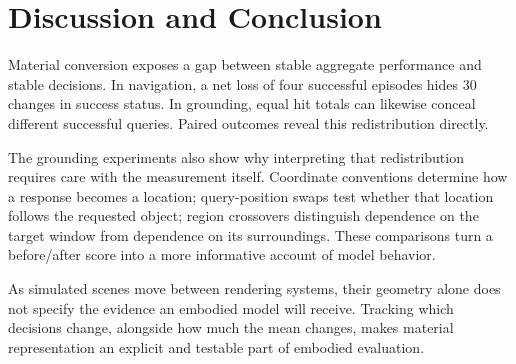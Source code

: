 \section{Discussion and Conclusion}

Material conversion exposes a gap between stable aggregate performance and
stable decisions. In navigation, a net loss of four successful episodes hides
30 changes in success status. In grounding, equal hit totals can likewise
conceal different successful queries. Paired outcomes reveal this redistribution
directly.

The grounding experiments also show why interpreting that redistribution
requires care with the measurement itself. Coordinate conventions determine how
a response becomes a location; query-position swaps test whether that location
follows the requested object; region crossovers distinguish dependence on the
target window from dependence on its surroundings. These comparisons turn a
before/after score into a more informative account of model behavior.

As simulated scenes move between rendering systems, their geometry alone does
not specify the evidence an embodied model will receive. Tracking which
decisions change, alongside how much the mean changes, makes material
representation an explicit and testable part of embodied evaluation.
